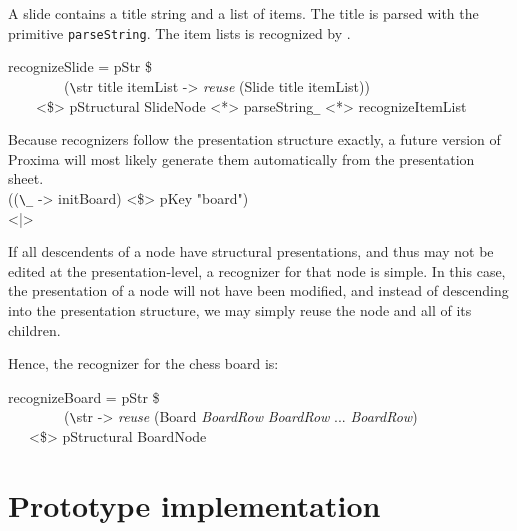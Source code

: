 A slide contains a title string and a list of items.  The title is parsed with the primitive \verb|parseString|. The item lists is recognized by .

\ttfamily\begin{small}\begin{tabbing}
recognizeSlide = pStr \$\\
~~~~~~~~(\verb|\|str title itemList -> {\em reuse} (Slide title itemList))\\
~~~~<\$> pStructural SlideNode <*> parseString\verb|_| <*> recognizeItemList
\end{tabbing}\end{small}\rmfamily

Because recognizers follow the presentation structure exactly, a future version of Proxima will most likely generate them automatically from the presentation sheet. 
\bc \\
      ((\verb|\_| -> initBoard) <\$> pKey "board")\\
  <|>    \ec
{}

If all descendents of a node have structural presentations, and thus may not be edited at the presentation-level, a recognizer for that node is simple. In this case, the presentation of a node will not have been modified, and instead of descending into the presentation structure, we may simply reuse the node and all of its children.

Hence, the recognizer for the chess board is:

\ttfamily\begin{small}\begin{tabbing}
recognizeBoard = pStr \$\\
~~~~~~~~(\verb|\|str -> {\em reuse} (Board {\em BoardRow} {\em BoardRow} ... {\em BoardRow})\\
~~~<\$> pStructural BoardNode\\
\end{tabbing}\end{small}\rmfamily





%																
%																
%																
\section{Prototype implementation} \label{sect:proxImpl}



